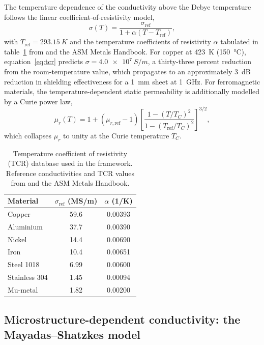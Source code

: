 \documentclass[review,3p,authoryear]{elsarticle}
\begin{document}
The temperature dependence of the conductivity above the Debye temperature follows the linear coefficient-of-resistivity model,
\begin{equation}
\sigma(T) = \frac{\sigma_{\mathrm{ref}}}{1 + \alpha (T - T_{\mathrm{ref}})},
\label{eq:tcr}
\end{equation}
with $T_{\mathrm{ref}} = \SI{293.15}{K}$ and the temperature coefficients of resistivity $\alpha$ tabulated in table~\ref{tab:tcr} from \citet{Matula1979} and the ASM Metals Handbook. For copper at \SI{423}{K} (\SI{150}{\degreeCelsius}), equation~\eqref{eq:tcr} predicts $\sigma = \SI{4.0e7}{S/m}$, a thirty-three percent reduction from the room-temperature value, which propagates to an approximately \SI{3}{dB} reduction in shielding effectiveness for a \SI{1}{mm} sheet at \SI{1}{GHz}. For ferromagnetic materials, the temperature-dependent static permeability is additionally modelled by a Curie power law,
\begin{equation}
\mu_r(T) = 1 + (\mu_{r,\mathrm{ref}} - 1)\!\left[\frac{1 - (T/T_C)^2}{1 - (T_{\mathrm{ref}}/T_C)^2}\right]^{3/2},
\label{eq:curie}
\end{equation}
which collapses $\mu_r$ to unity at the Curie temperature $T_C$.

\begin{table}[htbp]
\centering
\caption{Temperature coefficient of resistivity (TCR) database used in the framework. Reference conductivities and TCR values from \citet{Matula1979} and the ASM Metals Handbook.}
\label{tab:tcr}
\begin{tabular}{@{}lcc@{}}
\toprule
Material & $\sigma_{\mathrm{ref}}$ (\si{MS/m}) & $\alpha$ (\si{1/K}) \\
\midrule
Copper          & 59.6 & 0.00393 \\
Aluminium       & 37.7 & 0.00390 \\
Nickel          & 14.4 & 0.00690 \\
Iron            & 10.4 & 0.00651 \\
Steel 1018      &  6.99& 0.00600 \\
Stainless 304   &  1.45& 0.00094 \\
Mu-metal        &  1.82& 0.00200 \\
\bottomrule
\end{tabular}
\end{table}

\subsection{Microstructure-dependent conductivity: the Mayadas--Shatzkes model}
\label{sec:mayadas}
\end{document}
